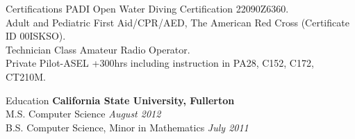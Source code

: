 \documentclass{resume} %
\begin{document}




\begin{rSection}{Certifications}
{\bf } PADI Open Water Diving Certification 22090Z6360.\\
{\bf } Adult and Pediatric First Aid/CPR/AED, The American Red Cross (Certificate ID 00ISKSO).\\
{\bf } Technician Class Amateur Radio Operator. \\
{\bf } Private Pilot-ASEL +300hrs including instruction in PA28, C152, C172, CT210M.\\

\end{rSection}


\begin{rSection}{Education}
{\bf California State University, Fullerton}  \\ 
M.S. Computer Science \hfill {\em August 2012}\\
B.S. Computer Science, Minor in Mathematics  \hfill {\em July 2011}\\
\end{rSection}






\end{document}
